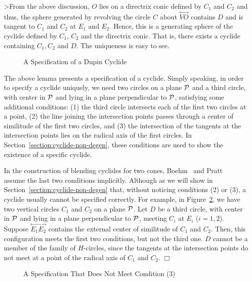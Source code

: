 >From the above discussion, $O$ lies on a directrix conic defined by $C_1$ and
$C_2$ and thus, the sphere generated by revolving the circle $C$ about
$\stackrel{\longleftrightarrow}{VO}$ contains $D$
and is tangent to $C_1$ and $C_2$ at $E_1$ and $E_2$.  
Hence, this is a generating sphere of the cyclide defined by $C_1$, $C_2$ and
the directrix conic.  That is, there exists a
cyclide containing $C_1,C_2$ and $D$.  The uniqueness is easy to see. \QED
\begin{figure}
\vspace{4.5cm}
\caption{A Specification of a Dupin Cyclide}
\label{fig:specification-nondegen}
\end{figure}

     The above lemma presents a specification of a cyclide.  Simply speaking,
in order to specify a cyclide uniquely, we need two circles on a plane 
${\cal P}$ and a third circle, with center in ${\cal P}$ and lying in a plane 
perpendicular to ${\cal P}$, satisfying some additional conditions: 
(1) the third circle intersects each of
the first two circles at a point, (2) the line joining the intersection points
passes through a center of similitude of the first two circles, and
(3) the intersection of the tangents at the intersection points lies on the
radical axis of the first circles.  
In Section~\ref{section:cyclide-non-degen}, these conditions are used to show
the existence of a specific cyclide.

\begin{remark} \rm
     In the construction of blending cyclides for two cones, 
Boehm~\cite{boehm:1990} and Pratt~\cite{pratt:1990} assume 
the last two conditions implicitly.  Although as we will show in
Section~\ref{section:cyclide-non-degen} that, without
noticing conditions (2) or (3), a cyclide usually cannot be specified 
correctly.  For example, in Figure~\ref{fig:wrong-example}, we have two 
vertical circles $C_1$ and $C_2$ on a plane ${\cal P}$.  
Let $D$ be a third circle, with center in ${\cal P}$ and lying in a plane
perpendicular to ${\cal P}$, meeting $C_i$ at $E_i$ ($i=1,2$).
Suppose $\stackrel{\longleftrightarrow}{E_1E_2}$ contains the external center
of similitude of $C_1$ and $C_2$.  Then, this configuration meets the first two
conditions, but not the third one.  $D$ cannot be a member of the family of 
$H$-circles, since the tangents at the intersection points do not meet at a 
point of the radical axis of $C_1$ and $C_2$.  $\Box$
\end{remark}
\begin{figure}
\vspace{5.5cm}
\caption{A Specification That Does Not Meet Condition (3)}
\label{fig:wrong-example}
\end{figure}


